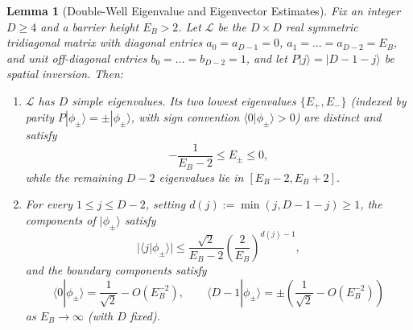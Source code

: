 \documentclass[11pt,a4paper]{article}
\numberwithin{equation}{section}
\theoremstyle{plain}
\newtheorem{lemma}[theorem]{Lemma}
\theoremstyle{definition}
\begin{document}
\begin{lemma}[Double-Well Eigenvalue and Eigenvector Estimates]\label{lem:app-doublewell}
Fix an integer $D\ge 4$ and a barrier height $E_B > 2$. Let $\mathcal{L}$ be the $D\times D$ real symmetric tridiagonal matrix with diagonal entries $a_0 = a_{D-1} = 0$, $a_1 = \dots = a_{D-2} = E_B$, and unit off-diagonal entries $b_0 = \dots = b_{D-2} = 1$, and let $P|j\rangle = |D-1-j\rangle$ be spatial inversion. Then:
\begin{enumerate}
  \setlength{\itemsep}{2pt}\setlength{\parskip}{0pt}
  \item[\emph{(1)}] $\mathcal{L}$ has $D$ simple eigenvalues. Its two lowest eigenvalues $\{E_+, E_-\}$ (indexed by parity $P|\phi_\pm\rangle = \pm|\phi_\pm\rangle$, with sign convention $\langle 0|\phi_\pm\rangle > 0$) are distinct and satisfy
  \begin{equation}\label{eq:dw-evals}
    -\frac{1}{E_B - 2} \le E_\pm \le 0,
  \end{equation}
  while the remaining $D-2$ eigenvalues lie in $[E_B - 2, E_B + 2]$.
  \item[\emph{(2)}] For every $1\le j\le D-2$, setting $d(j) := \min(j, D-1-j)\ge 1$, the components of $|\phi_\pm\rangle$ satisfy
  \begin{equation}\label{eq:dw-decay}
    \bigl|\langle j|\phi_\pm\rangle\bigr| \le \frac{\sqrt{2}}{E_B - 2}\left(\frac{2}{E_B}\right)^{d(j)-1},
  \end{equation}
  and the boundary components satisfy
  \begin{equation}\label{eq:dw-boundary}
    \langle 0|\phi_\pm\rangle = \frac{1}{\sqrt{2}} - O(E_B^{-2}), \qquad
    \langle D-1|\phi_\pm\rangle = \pm\left(\frac{1}{\sqrt{2}} - O(E_B^{-2})\right)
  \end{equation}
  as $E_B\to\infty$ (with $D$ fixed).
\end{enumerate}
\end{lemma}
\end{document}
